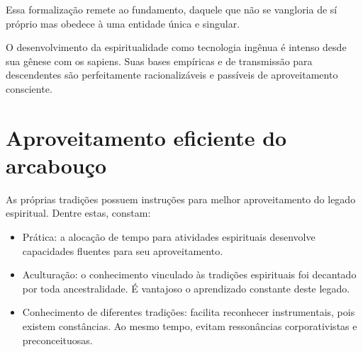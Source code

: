 \documentclass[a4paper]{article}
\begin{document}
Essa formalização remete ao fundamento, daquele que não se vangloria de sí
próprio mas obedece à uma entidade única e singular.

O desenvolvimento da espiritualidade como tecnologia ingênua é intenso desde sua
gênese com os sapiens. Suas bases empíricas e de transmissão para descendentes
são perfeitamente racionalizáveis e passíveis de aproveitamento consciente.

\section{Aproveitamento eficiente do arcabouço}

\qquad As próprias tradições possuem instruções para melhor aproveitamento do
legado espiritual. Dentre estas, constam:

\begin{itemize}
  \item Prática: a alocação de tempo para atividades espirituais desenvolve
  capacidades fluentes para seu aproveitamento.

  \item Aculturação: o conhecimento vinculado às tradições espirituais foi
  decantado por toda ancestralidade. É vantajoso o aprendizado constante deste
  legado.

  \item Conhecimento de diferentes tradições: facilita reconhecer instrumentais,
  pois existem constâncias. Ao mesmo tempo, evitam ressonâncias corporativistas
  e preconceituosas.
\end{itemize}
\end{document}
